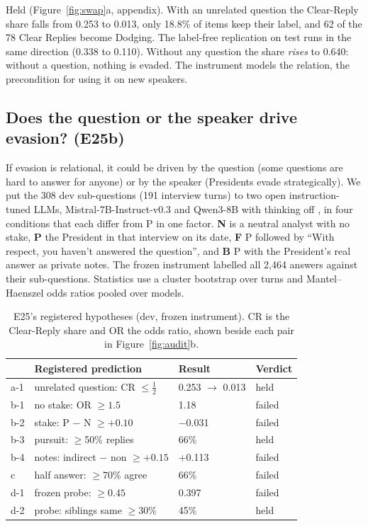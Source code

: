 Held (Figure~\ref{fig:swap}a, appendix).
With an unrelated question the Clear-Reply share falls from 0.253 to 0.013, only 18.8\% of items keep their label, and 62 of the 78 Clear Replies become Dodging. The label-free replication on test runs in the same direction (0.338 to 0.110).
Without any question the share \emph{rises} to 0.640: without a question, nothing is evaded.
The instrument models the relation, the precondition for using it on new speakers.

\subsection{Does the question or the speaker drive evasion? (E25b)}

If evasion is relational, it could be driven by the question (some questions are hard to answer for anyone) or by the speaker (Presidents evade strategically).
We put the 308 dev sub-questions (191 interview turns) to two open instruction-tuned LLMs, Mistral-7B-Instruct-v0.3 \citep{jiang2023mistral} and Qwen3-8B with thinking off \citep{qwen3}, in four conditions that each differ from P in one factor. \textbf{N} is a neutral analyst with no stake, \textbf{P} the President in that interview on its date, \textbf{F} P followed by ``With respect, you haven't answered the question'', and \textbf{B} P with the President's real answer as private notes.
The frozen instrument labelled all 2,464 answers against their sub-questions. Statistics use a cluster bootstrap over turns and Mantel--Haenszel odds ratios pooled over models.

\FigureAudit

\begin{table}[t]
\centering
\small
\setlength{\tabcolsep}{3pt}
\begin{tabular}{@{}llll@{}}
\toprule
 & Registered prediction & Result & Verdict \\
\midrule
a-1 & unrelated question: CR $\le \tfrac12$ & 0.253 $\rightarrow$ 0.013 & held \\
b-1 & no stake: OR $\ge 1.5$ & 1.18 & failed \\
b-2 & stake: P $-$ N $\ge +0.10$ & $-$0.031 & failed \\
b-3 & pursuit: $\ge$50\% replies & 66\% & held \\
b-4 & notes: indirect $-$ non $\ge +0.15$ & +0.113 & failed \\
c & half answer: $\ge$70\% agree & 66\% & failed \\
d-1 & frozen probe: \Stwo{} $\ge 0.45$ & 0.397 & failed \\
d-2 & probe: siblings same $\ge$30\% & 45\% & held \\
\bottomrule
\end{tabular}
\caption{E25's registered hypotheses (dev, frozen instrument). CR is the Clear-Reply share and OR the odds ratio, shown beside each pair in Figure~\ref{fig:audit}b.}
\label{tab:e25}
\end{table}

